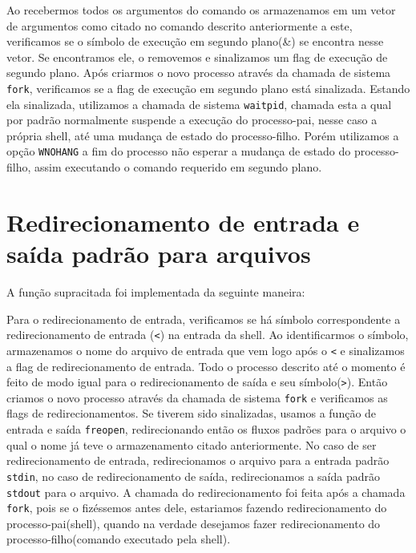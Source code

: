 \documentclass[12pt]{article}
\begin{document}
Ao recebermos todos os argumentos do comando os armazenamos em um vetor de argumentos como citado no comando descrito anteriormente a este, verificamos se o símbolo de execução em segundo plano(\&) se encontra nesse vetor.
Se encontramos ele, o removemos e sinalizamos um flag de execução de segundo plano.
Após criarmos o novo processo através da chamada de sistema \texttt{fork},
verificamos se a flag de execução em segundo plano está sinalizada.
Estando ela sinalizada, utilizamos a chamada de sistema \texttt{waitpid},
chamada esta a qual por padrão normalmente suspende a execução do processo-pai,
nesse caso a própria shell, até uma mudança de estado do processo-filho.
Porém utilizamos a opção \texttt{WNOHANG} a fim do processo não esperar
a mudança de estado do processo-filho, assim executando o comando requerido em segundo plano.

\section*{Redirecionamento de entrada e saída padrão para arquivos}
A função supracitada foi implementada da seguinte maneira:

Para o redirecionamento de entrada, verificamos se há símbolo correspondente a redirecionamento de entrada (\texttt{<})
na entrada da shell.
Ao identificarmos o símbolo, armazenamos o nome do arquivo de entrada que vem logo após o \texttt{<}
e sinalizamos a flag de redirecionamento de entrada.
Todo o processo descrito até o momento é feito de modo igual para o redirecionamento de saída e seu símbolo(\texttt{>}).
Então criamos o novo processo através da chamada de sistema \texttt{fork}
e verificamos as flags de redirecionamentos.
Se tiverem sido sinalizadas, usamos a função de entrada e saída
\texttt{freopen}, redirecionando então os fluxos padrões para o arquivo o qual o nome já teve o armazenamento citado anteriormente.
No caso de ser redirecionamento de entrada, redirecionamos o arquivo para a entrada padrão \texttt{stdin},
no caso de redirecionamento de saída, redirecionamos a saída padrão \texttt{stdout} para o arquivo.
A chamada do redirecionamento foi feita após a chamada \texttt{fork},
pois se o fizéssemos antes dele, estariamos fazendo redirecionamento do processo-pai(shell),
quando na verdade desejamos fazer redirecionamento do processo-filho(comando executado pela shell).


%

\end{document}
